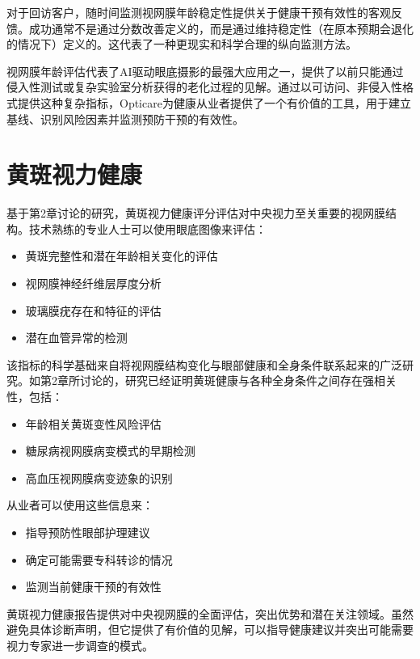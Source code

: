 \documentclass[
  Letterpaper,
]{scrbook}
\providecommand{\tightlist}{%
  \setlength{\itemsep}{0pt}\setlength{\parskip}{0pt}}\usepackage{longtable,booktabs,array}
\begin{document}
对于回访客户，随时间监测视网膜年龄稳定性提供关于健康干预有效性的客观反馈。成功通常不是通过分数改善定义的，而是通过维持稳定性（在原本预期会退化的情况下）定义的。这代表了一种更现实和科学合理的纵向监测方法。

视网膜年龄评估代表了AI驱动眼底摄影的最强大应用之一，提供了以前只能通过侵入性测试或复杂实验室分析获得的老化过程的见解。通过以可访问、非侵入性格式提供这种复杂指标，Opticare为健康从业者提供了一个有价值的工具，用于建立基线、识别风险因素并监测预防干预的有效性。

\section{黄斑视力健康}\label{ux9ec4ux6591ux89c6ux529bux5065ux5eb7}

基于第2章讨论的研究，黄斑视力健康评分评估对中央视力至关重要的视网膜结构。技术熟练的专业人士可以使用眼底图像来评估：

\begin{itemize}
\tightlist
\item
  黄斑完整性和潜在年龄相关变化的评估
\item
  视网膜神经纤维层厚度分析
\item
  玻璃膜疣存在和特征的评估
\item
  潜在血管异常的检测
\end{itemize}

该指标的科学基础来自将视网膜结构变化与眼部健康和全身条件联系起来的广泛研究。如第2章所讨论的，研究已经证明黄斑健康与各种全身条件之间存在强相关性，包括：

\begin{itemize}
\tightlist
\item
  年龄相关黄斑变性风险评估
\item
  糖尿病视网膜病变模式的早期检测
\item
  高血压视网膜病变迹象的识别
\end{itemize}

从业者可以使用这些信息来：

\begin{itemize}
\tightlist
\item
  指导预防性眼部护理建议
\item
  确定可能需要专科转诊的情况
\item
  监测当前健康干预的有效性
\end{itemize}

黄斑视力健康报告提供对中央视网膜的全面评估，突出优势和潜在关注领域。虽然避免具体诊断声明，但它提供了有价值的见解，可以指导健康建议并突出可能需要视力专家进一步调查的模式。
\end{document}
